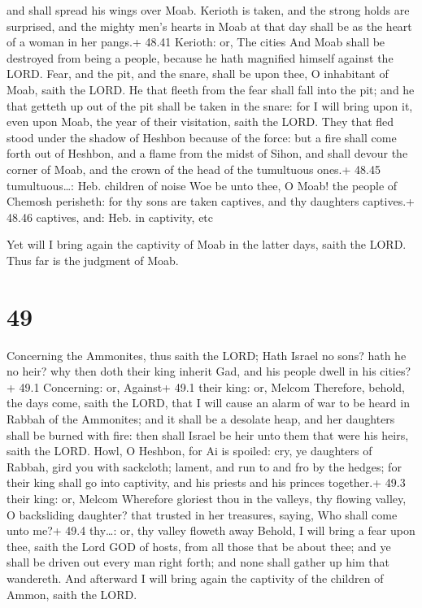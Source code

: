 and shall spread his wings over Moab.  Kerioth is taken,
and the strong holds are surprised, and the mighty men's hearts in Moab
at that day shall be as the heart of a woman in her pangs.+ 48.41
Kerioth: or, The cities  And Moab shall be destroyed from
being a people, because he hath magnified himself against the LORD.
 Fear, and the pit, and the snare, shall be upon thee, O
inhabitant of Moab, saith the LORD.  He that fleeth from
the fear shall fall into the pit; and he that getteth up out of the pit
shall be taken in the snare: for I will bring upon it, even upon Moab,
the year of their visitation, saith the LORD.  They that
fled stood under the shadow of Heshbon because of the force: but a fire
shall come forth out of Heshbon, and a flame from the midst of Sihon,
and shall devour the corner of Moab, and the crown of the head of the
tumultuous ones.+ 48.45 tumultuous\ldots: Heb. children of noise
 Woe be unto thee, O Moab! the people of Chemosh perisheth:
for thy sons are taken captives, and thy daughters captives.+ 48.46
captives, and: Heb. in captivity, etc

 Yet will I bring again the captivity of Moab in the
latter days, saith the LORD. Thus far is the judgment of Moab.

\hypertarget{section-48}{%
\section{49}\label{section-48}}

 Concerning the Ammonites, thus saith the LORD; Hath Israel
no sons? hath he no heir? why then doth their king inherit Gad, and his
people dwell in his cities?+ 49.1 Concerning: or, Against+ 49.1 their
king: or, Melcom  Therefore, behold, the days come, saith
the LORD, that I will cause an alarm of war to be heard in Rabbah of the
Ammonites; and it shall be a desolate heap, and her daughters shall be
burned with fire: then shall Israel be heir unto them that were his
heirs, saith the LORD.  Howl, O Heshbon, for Ai is spoiled:
cry, ye daughters of Rabbah, gird you with sackcloth; lament, and run to
and fro by the hedges; for their king shall go into captivity, and his
priests and his princes together.+ 49.3 their king: or, Melcom
 Wherefore gloriest thou in the valleys, thy flowing valley,
O backsliding daughter? that trusted in her treasures, saying, Who shall
come unto me?+ 49.4 thy\ldots: or, thy valley floweth away 
Behold, I will bring a fear upon thee, saith the Lord GOD of hosts, from
all those that be about thee; and ye shall be driven out every man right
forth; and none shall gather up him that wandereth.  And
afterward I will bring again the captivity of the children of Ammon,
saith the LORD.

